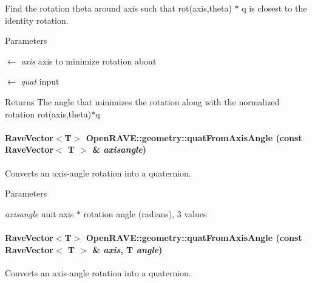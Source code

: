 Find the rotation theta around axis such that rot(axis,theta) $\ast$ q is closest to the identity rotation. 


\begin{DoxyParams}{Parameters}
\item[\mbox{$\leftarrow$} {\em axis}]axis to minimize rotation about \item[\mbox{$\leftarrow$} {\em quat}]input \end{DoxyParams}
\begin{DoxyReturn}{Returns}
The angle that minimizes the rotation along with the normalized rotation rot(axis,theta)$\ast$q 
\end{DoxyReturn}
\hypertarget{group__affine__math_gacf8a968523673f5e3e3c08ffafd75a84}{
\paragraph[{quatFromAxisAngle}]{\setlength{\rightskip}{0pt plus 5cm}RaveVector$<$T$>$ OpenRAVE::geometry::quatFromAxisAngle (const RaveVector$<$ T $>$ \& {\em axisangle})}\hfill}
\label{group__affine__math_gacf8a968523673f5e3e3c08ffafd75a84}


Converts an axis-\/angle rotation into a quaternion. 


\begin{DoxyParams}{Parameters}
\item[{\em axisangle}]unit axis $\ast$ rotation angle (radians), 3 values \end{DoxyParams}
\hypertarget{group__affine__math_ga8a5d9ee6c215ae740e449a8310e4e9d4}{
\paragraph[{quatFromAxisAngle}]{\setlength{\rightskip}{0pt plus 5cm}RaveVector$<$T$>$ OpenRAVE::geometry::quatFromAxisAngle (const RaveVector$<$ T $>$ \& {\em axis}, \/  T {\em angle})}\hfill}
\label{group__affine__math_ga8a5d9ee6c215ae740e449a8310e4e9d4}


Converts an axis-\/angle rotation into a quaternion. 



